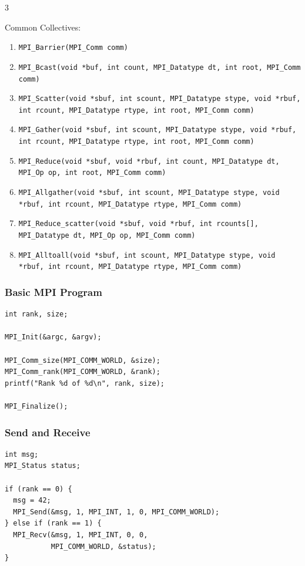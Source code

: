 \documentclass[12pt, a4paper]{article}
\begin{document}
\begin{multicols*}{3}
{Common Collectives:
\begin{enumerate}[\roman*.]
  \item \lstinline|MPI_Barrier(MPI_Comm comm)|
  \item \lstinline|MPI_Bcast(void *buf, int count, MPI_Datatype dt, int root, MPI_Comm comm)|
  \item \lstinline|MPI_Scatter(void *sbuf, int scount, MPI_Datatype stype, void *rbuf, int rcount, MPI_Datatype rtype, int root, MPI_Comm comm)|
  \item \lstinline|MPI_Gather(void *sbuf, int scount, MPI_Datatype stype, void *rbuf, int rcount, MPI_Datatype rtype, int root, MPI_Comm comm)|
  \item \lstinline|MPI_Reduce(void *sbuf, void *rbuf, int count, MPI_Datatype dt, MPI_Op op, int root, MPI_Comm comm)|
  \item \lstinline|MPI_Allgather(void *sbuf, int scount, MPI_Datatype stype, void *rbuf, int rcount, MPI_Datatype rtype, MPI_Comm comm)|
  \item \lstinline|MPI_Reduce_scatter(void *sbuf, void *rbuf, int rcounts[], MPI_Datatype dt, MPI_Op op, MPI_Comm comm)|
  \item \lstinline|MPI_Alltoall(void *sbuf, int scount, MPI_Datatype stype, void *rbuf, int rcount, MPI_Datatype rtype, MPI_Comm comm)|
\end{enumerate}
}

\colbreak
\subsubsection{Basic MPI Program}
\begin{lstlisting}[basicstyle=\ttfamily\scriptsize]
int rank, size;

MPI_Init(&argc, &argv);

MPI_Comm_size(MPI_COMM_WORLD, &size);
MPI_Comm_rank(MPI_COMM_WORLD, &rank);
printf("Rank %d of %d\n", rank, size);

MPI_Finalize();
\end{lstlisting}

\subsubsection{Send and Receive}
\begin{lstlisting}[basicstyle=\ttfamily\scriptsize]
int msg;
MPI_Status status;

if (rank == 0) {
  msg = 42;
  MPI_Send(&msg, 1, MPI_INT, 1, 0, MPI_COMM_WORLD);
} else if (rank == 1) {
  MPI_Recv(&msg, 1, MPI_INT, 0, 0,
           MPI_COMM_WORLD, &status);
}
\end{lstlisting}


\end{multicols*}
\end{document}
